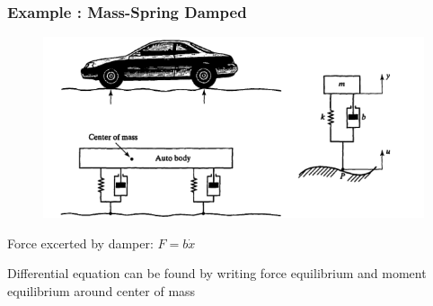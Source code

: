 \begin{frame}
	\frametitle{Example : Mass-Spring Damped}
	\begin{figure}
		\centering
		\includegraphics[width=1\linewidth]{img/mass-spring-damped}
		\label{fig:mass-spring-damped}
	\end{figure}
	Force excerted by damper: $F = b\dot{x}$
	
	Differential equation can be found by writing force equilibrium and moment equilibrium around center of mass
	
\end{frame}

